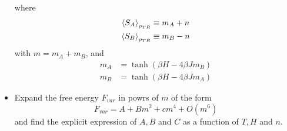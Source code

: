 \documentclass[../main/main.tex]{subfiles}
\begin{document}
\begin{exercise}{}{}
\begin{itemize}
where
\begin{subequations}
\begin{align}
   \expval{S_A}_{\rho _{TR}}  & \equiv m_A + n \\
    \expval{S_B}_{\rho _{TR}}  & \equiv m_B - n
\end{align}
\end{subequations}
with \( m=m_A+m_B \), and
\begin{subequations}
\begin{align}
   m_A &= \tanh ( \beta H - 4 \beta J m_B) \\
    m_B &= \tanh ( \beta H - 4 \beta J m_A)
\end{align}
\end{subequations}
\item Expand the free energy \( F_{var} \) in powrs of \( m \) of the form
\begin{equation}
  F_{var} = A + B m^2 + c m^4 + O (m^6)
\end{equation}
and find the explicit expression of \( A,B \) and \( C \) as a function of \( T,H \) and \( n \).
\end{itemize}

\end{exercise}
\end{document}
